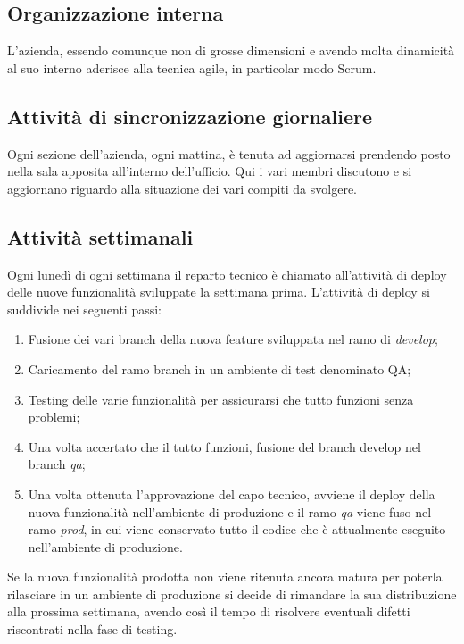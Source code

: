 \subsection{Organizzazione interna}

L'azienda, essendo comunque non di grosse dimensioni e avendo molta dinamicità
al suo interno aderisce alla tecnica agile, in particolar modo Scrum.

\subsection{Attività di sincronizzazione giornaliere}

Ogni sezione dell'azienda, ogni mattina, è tenuta ad aggiornarsi prendendo posto
nella sala apposita all'interno dell'ufficio. Qui i vari membri discutono e si
aggiornano riguardo alla situazione dei vari compiti da svolgere.

\subsection{Attività settimanali}
\label{intro:attivitaSettimanali}
Ogni lunedì di ogni settimana il reparto tecnico è chiamato all'attività di
deploy delle nuove funzionalità sviluppate la settimana prima. L'attività di
deploy si suddivide nei seguenti passi:
\begin{enumerate}

  \item Fusione dei vari branch della nuova feature sviluppata nel ramo di
\textit{develop};
\item Caricamento del ramo branch in un ambiente di test denominato QA;
\item Testing delle varie funzionalità per assicurarsi che tutto funzioni senza
problemi;
\item Una volta accertato che il tutto funzioni, fusione del branch develop nel
branch \textit{qa};
\item Una volta ottenuta l'approvazione del capo tecnico, avviene il deploy
della nuova funzionalità nell'ambiente di produzione e il ramo \textit{qa}
viene fuso nel ramo \textit{prod}, in cui viene conservato tutto il codice che
è attualmente eseguito nell'ambiente di produzione.
\end{enumerate}

Se la nuova funzionalità prodotta non viene ritenuta ancora matura per poterla
rilasciare in un ambiente di produzione si decide di rimandare la sua
distribuzione alla prossima settimana, avendo così il tempo di risolvere
eventuali difetti riscontrati nella fase di testing.

